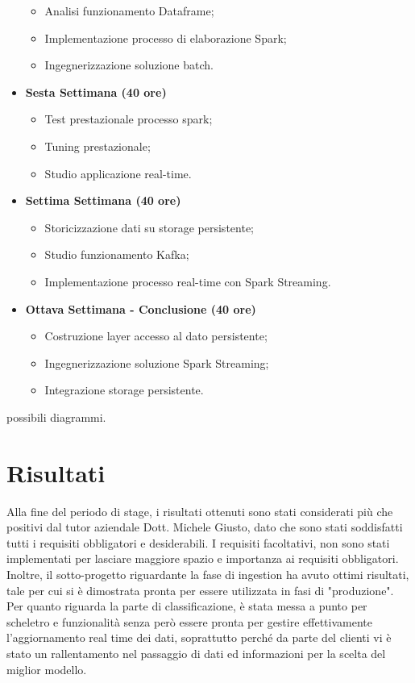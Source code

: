 \begin{itemize}
\begin{itemize}
		\item Analisi funzionamento Dataframe;
		\item Implementazione processo di elaborazione Spark;
		\item Ingegnerizzazione soluzione batch.
	\end{itemize}
	\item[] \textbf{Sesta Settimana (40 ore)} 
	\begin{itemize}
		\item Test prestazionale processo spark;
		\item Tuning prestazionale;
		\item Studio applicazione real-time.
	\end{itemize}
	\item[] \textbf{Settima Settimana (40 ore)} 
	\begin{itemize}
		\item Storicizzazione dati su storage persistente;
		\item Studio funzionamento Kafka;
		\item Implementazione processo real-time con Spark Streaming.
	\end{itemize}
	\item[] \textbf{Ottava Settimana - Conclusione (40 ore)} 
	\begin{itemize}
		\item Costruzione layer accesso al dato persistente;
		\item Ingegnerizzazione soluzione Spark Streaming;
		\item Integrazione storage persistente.
	\end{itemize}
\end{itemize}
possibili diagrammi.
\section{Risultati}
Alla fine del periodo di stage, i risultati ottenuti sono stati considerati più che positivi dal tutor aziendale Dott. Michele Giusto, dato che sono stati soddisfatti tutti i requisiti obbligatori e desiderabili. I requisiti facoltativi, non sono stati implementati per lasciare maggiore spazio e importanza ai requisiti obbligatori.
\\
Inoltre, il sotto-progetto riguardante la fase di ingestion ha avuto ottimi risultati, tale per cui si è dimostrata pronta per essere utilizzata in fasi di "produzione".
Per quanto riguarda la parte di classificazione, è stata messa a punto per scheletro e funzionalità senza però essere pronta per gestire effettivamente l'aggiornamento real time dei dati, soprattutto perché da parte del clienti vi è stato un rallentamento nel passaggio di dati ed informazioni per la scelta del miglior modello. 


